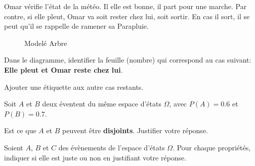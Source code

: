 \documentclass[10pt,largemargins]{homework}
\begin{document}
\maketitle


Omar vérifie l'état de la météo. Il elle est bonne, il part pour une marche.
Par contre, si elle pleut, Omar va soit rester chez lui, soit sortir. En cas
il sort, il se peut qu'il se rappelle de ramener sa Parapluie. 
\begin{figure}[htpb]
    \centering
    
    \caption{Modelé Arbre}
    \label{fig:omar}
\end{figure}


\begin{arabicparts}
    \small
    \item Dans le diagramme, identifier la feuille (nombre) qui correspond au cas suivant: \textbf{Elle pleut et Omar reste
        chez lui}.
    \item Ajouter une étiquette aux autre cas restants.
\end{arabicparts}

\question%
Soit $A$ et $B$ deux éventent du même espace d'états $\Omega$, avec $P(A)
= 0.6$ et $P(B) = 0.7$.

\begin{arabicparts}
    \item Est ce que $A$ et $B$ peuvent être
        \textbf{disjoints}. Justifier votre réponse.
\end{arabicparts}
Soient $A$, $B$ et $C$ des évènements de l'espace d'états $\Omega$. Pour chaque
propriétés, indiquer si elle est juste ou non en justifiant votre
réponse.
\end{document}
